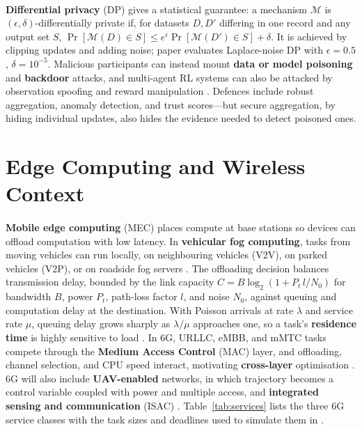 \documentclass[12pt,a4paper,final]{extreport}
\begin{document}
\paragraph{} \textbf{Differential privacy} (DP) gives a statistical guarantee: a mechanism $\mathcal{M}$ is $(\epsilon,\delta)$-differentially private if, for datasets $D,D'$ differing in one record and any output set $S$, $\Pr[\mathcal{M}(D)\in S]\le e^{\epsilon}\Pr[\mathcal{M}(D')\in S]+\delta$. It is achieved by clipping updates and adding noise; paper \cite{p4} evaluates Laplace-noise DP with $\epsilon=0.5$, $\delta=10^{-5}$. Malicious participants can instead mount \textbf{data or model poisoning} and \textbf{backdoor} attacks, and multi-agent RL systems can also be attacked by observation spoofing and reward manipulation \cite{p3}. Defences include robust aggregation, anomaly detection, and trust scores---but secure aggregation, by hiding individual updates, also hides the evidence needed to detect poisoned ones.

\section{Edge Computing and Wireless Context}

\paragraph{} \textbf{Mobile edge computing} (MEC) places compute at base stations so devices can offload computation with low latency. In \textbf{vehicular fog computing}, tasks from moving vehicles can run locally, on neighbouring vehicles (V2V), on parked vehicles (V2P), or on roadside fog servers \cite{p1}. The offloading decision balances transmission delay, bounded by the link capacity $C=B\log_2(1+P_t\,l/N_0)$ for bandwidth $B$, power $P_t$, path-loss factor $l$, and noise $N_0$, against queuing and computation delay at the destination. With Poisson arrivals at rate $\lambda$ and service rate $\mu$, queuing delay grows sharply as $\lambda/\mu$ approaches one, so a task's \textbf{residence time} is highly sensitive to load \cite{p1}. In 6G, URLLC, eMBB, and mMTC tasks compete through the \textbf{Medium Access Control} (MAC) layer, and offloading, channel selection, and CPU speed interact, motivating \textbf{cross-layer} optimisation \cite{p2}. 6G will also include \textbf{UAV-enabled} networks, in which trajectory becomes a control variable coupled with power and multiple access, and \textbf{integrated sensing and communication} (ISAC) \cite{p3}. Table~\ref{tab:services} lists the three 6G service classes with the task sizes and deadlines used to simulate them in \cite{p2}.
\end{document}
